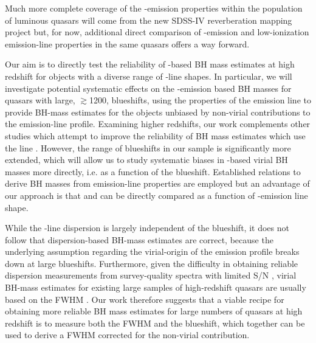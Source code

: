 Much more complete coverage of the -emission properties within the population of luminous quasars will come from the new SDSS-IV reverberation mapping project \citep{shen15} but, for now, additional direct comparison of -emission and low-ionization emission-line properties in the same quasars offers a way forward.




Our aim is to directly test the reliability of -based BH mass estimates at high redshift for objects with a diverse range of -line shapes.  
In particular, we will investigate potential systematic effects on the -emission based BH masses for quasars with large, $\gtrsim$1200\kms,  blueshifts, using the properties of the \ha emission line to provide BH-mass estimates for the objects unbiased by non-virial contributions to the emission-line profile.
Examining higher redshifts, our work complements other studies which attempt to improve the reliability of BH mass estimates which use the  line \citep[e.g.][]{runnoe13,denney12}. 
However, the range of  blueshifts in our sample is significantly more extended, which will allow us to study systematic biases in -based virial BH masses more directly, i.e. as a function of the  blueshift. 
Established relations to derive BH masses from emission-line properties are employed but an advantage of our approach is that  and \ha can be directly compared as a function of -emission line shape. 


While the -line dispersion is largely independent of the blueshift, it does not follow that dispersion-based BH-mass estimates are correct, because the underlying assumption regarding the virial-origin of the  emission profile breaks down at large blueshifts.
Furthermore, given the difficulty in obtaining reliable dispersion measurements from survey-quality spectra with limited S/N \citep[e.g.][]{mejia-restrepo16}, virial BH-mass estimates for existing large samples of high-redshift quasars are usually based on the FWHM \citep[e.g.][]{shen11}. 
Our work therefore suggests that a viable recipe for obtaining more reliable BH mass estimates for large numbers of quasars at high redshift is to measure both the FWHM and the blueshift, which together can be used to derive a FWHM corrected for the non-virial contribution. 



